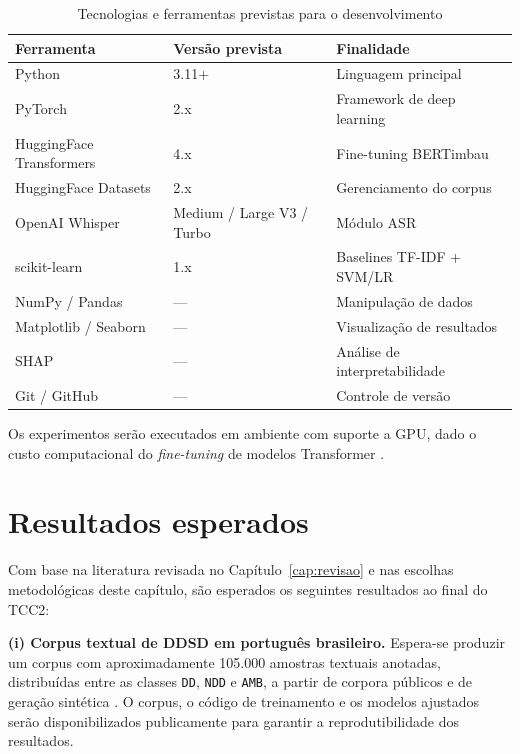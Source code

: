 \documentclass[
    12pt,                %
    openright,           %
    oneside,             %
    a4paper,             %
    english,             %
    brazil               %
]{abntex2}
\begin{document}
\begin{table}[htb]
    \centering
    \caption{Tecnologias e ferramentas previstas para o desenvolvimento}
    \label{tab:ferramentas}
    \begin{tabular}{lll}
        \toprule
        \textbf{Ferramenta}
            & \textbf{Versão prevista}
            & \textbf{Finalidade} \\
        \midrule
        Python          & 3.11+     & Linguagem principal \\
        PyTorch         & 2.x       & Framework de deep learning \\
        HuggingFace Transformers & 4.x & Fine-tuning BERTimbau \\
        HuggingFace Datasets & 2.x & Gerenciamento do corpus \\
        OpenAI Whisper  & Medium / Large V3 / Turbo & Módulo ASR \\
        scikit-learn    & 1.x       & Baselines TF-IDF + SVM/LR \\
        NumPy / Pandas  & ---       & Manipulação de dados \\
        Matplotlib / Seaborn & --- & Visualização de resultados \\
        SHAP            & ---       & Análise de interpretabilidade \\
        Git / GitHub    & ---       & Controle de versão \\
        \bottomrule
    \end{tabular}
\end{table}

Os experimentos serão executados em ambiente com suporte a GPU, dado o custo computacional do \textit{fine-tuning} de modelos Transformer \cite{Souza2020}.

\section{Resultados esperados}
\label{sec:resultados_esperados}

Com base na literatura revisada no Capítulo~\ref{cap:revisao} e nas escolhas metodológicas deste capítulo, são esperados os seguintes resultados ao final do TCC2:

\textbf{(i) Corpus textual de DDSD em português brasileiro.} Espera-se produzir um corpus com aproximadamente 105.000 amostras textuais anotadas, distribuídas entre as classes \texttt{DD}, \texttt{NDD} e \texttt{AMB}, a partir de corpora públicos e de geração sintética \cite{Møller2024}. O corpus, o código de treinamento e os modelos ajustados serão disponibilizados publicamente para garantir a reprodutibilidade dos resultados.
\end{document}
